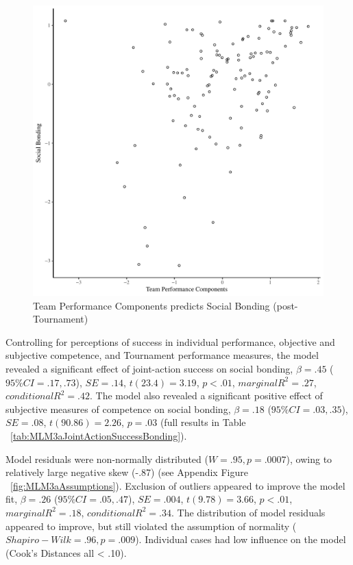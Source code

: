 \begin{CJK}{UTF8}{gbsn}
\begin{figure}[htbp]
  \centering
\includegraphics[scale=.5]{images/jasBondBasicXY.pdf}
  \caption{Team Performance Components predicts Social Bonding (post-Tournament)}
  \label{fig:jasBondBasicXY}
\end{figure}

Controlling for perceptions of success in individual performance, objective and subjective competence, and Tournament performance measures, the model revealed a significant effect of joint-action success on social bonding, $\beta = .45$ ($95\% CI =  .17, .73$), $SE = .14$, $t(23.4) = 3.19$, $p < .01$, $marginal R^2 = .27$, $conditional R^2 = .42$.  The model also revealed a significant positive effect of subjective measures of competence on social bonding, $\beta = .18$ ($95\% CI =  .03, .35$), $SE = .08$, $t(90.86) = 2.26$, $p = .03$ (full results in Table ~\ref{tab:MLM3aJointActionSuccessBonding}).

Model residuals were non-normally distributed ($W = .95, p = .0007$), owing to relatively large negative skew (-.87) (see Appendix Figure ~\ref{fig:MLM3aAssumptions}).
Exclusion of outliers appeared to improve the model fit, $\beta = .26$ ($95\% CI =  .05, .47$), $SE = .004$, $t(9.78) = 3.66$, $p < .01$, $marginal R^2 = .18$, $conditional R^2 = .34$.  The distribution of model residuals appeared to improve, but still violated the assumption of normality ($Shapiro-Wilk = .96, p = .009$).  Individual cases had low influence on the model (Cook's Distances all < .10).


\end{CJK}

